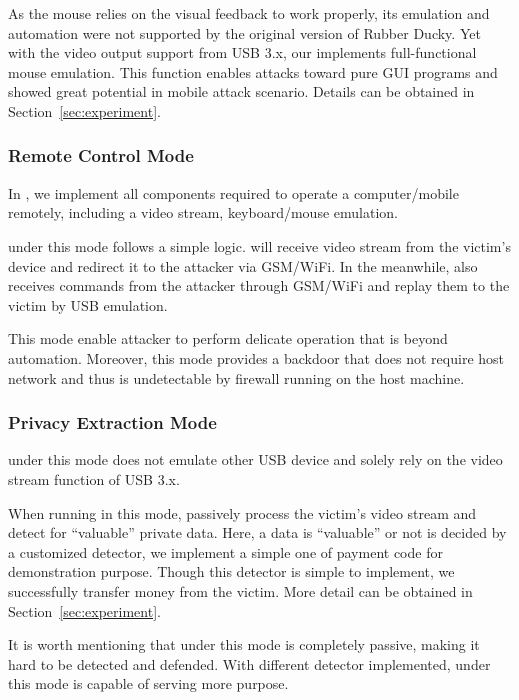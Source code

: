 As the mouse relies on the visual feedback to work properly, its emulation and automation were not supported by the original version of Rubber Ducky. Yet with the video output support from USB 3.x, our \tool implements full-functional mouse emulation. This function enables attacks toward pure GUI programs and showed great potential in mobile attack scenario. Details can be obtained in Section~\ref{sec:experiment}.
\subsubsection{Remote Control Mode}
In \tool, we implement all components required to operate a computer/mobile remotely, including a video stream, keyboard/mouse emulation.

\tool under this mode follows a simple logic. \tool will receive video stream from the victim's device and redirect it to the attacker via GSM/WiFi. In the meanwhile, \tool also receives commands from the attacker through GSM/WiFi and replay them to the victim by USB emulation.

This mode enable attacker to perform delicate operation that is beyond automation. Moreover, this mode provides a backdoor that does not require host network and thus is undetectable by firewall running on the host machine.
\subsubsection{Privacy Extraction Mode}
\tool under this mode does not emulate other USB device and solely rely on the video stream function of USB 3.x.

When running in this mode, \tool passively process the victim's video stream and detect for ``valuable'' private data.  Here, a data is ``valuable'' or not is decided by a customized detector, we implement a simple one of payment code for demonstration purpose. Though this detector is simple to implement, we successfully transfer money from the victim. More detail can be obtained in Section~\ref{sec:experiment}.

It is worth mentioning that \tool under this mode is completely passive, making it hard to be detected and defended. With different detector implemented, \tool under this mode is capable of serving more purpose.
